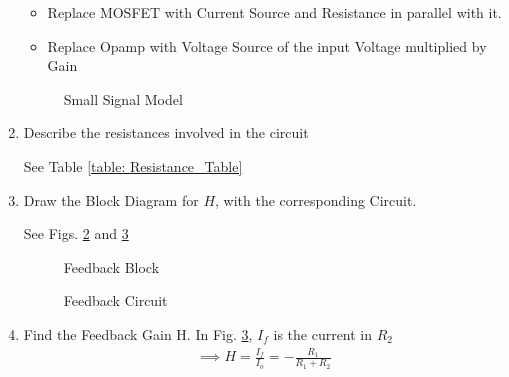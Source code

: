 \begin{enumerate}[label=\thesection.\arabic*.,ref=\thesection.\theenumi]
\begin{itemize}
    \item Replace MOSFET with Current Source and Resistance in parallel with it.
    \item Replace Opamp with Voltage Source of the input Voltage multiplied by Gain
\end{itemize}

\begin{figure}[!ht]
	\begin{center}
		\resizebox{\columnwidth}{!}{}
	\end{center}
\caption{Small Signal Model}
\label{fig:ee18btech11021_Small_Signal_Model}
\end{figure}

\item
Describe the resistances involved in the circuit

\solution  See Table \ref{table: Resistance_Table}

\begin{table}[!ht]
\centering

\caption{}
\label{table: Resistance_Table}
\end{table}

\item
Draw the Block Diagram for $H$, with the corresponding Circuit.

\solution See Figs. \ref{fig:ee18btech11021_Feedback_Block}
and 
\ref{fig:ee18btech11021_Feedback_Circuit}
\begin{figure}[!ht]
	\begin{center}
		\resizebox{\columnwidth}{!}{}
	\end{center}
\caption{Feedback Block}
\label{fig:ee18btech11021_Feedback_Block}
\end{figure}

\begin{figure}[!ht]
	\begin{center}
		\resizebox{\columnwidth}{!}{}
	\end{center}
\caption{Feedback Circuit}
\label{fig:ee18btech11021_Feedback_Circuit}
\end{figure}
\item
Find the Feedback Gain H.
\solution In Fig. \ref{fig:ee18btech11021_Feedback_Circuit}, $I_{f}$ is the current in $R_{2}$
\begin{align}
    \implies H = \frac{I_{f}}{I_{o}}=-\frac{R_{1}}{R_{1}+R_{2}}
\end{align}


\end{enumerate}

